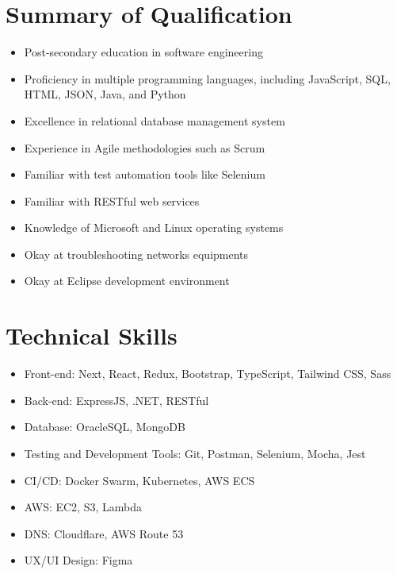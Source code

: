 \documentclass[a4paper,11pt]{article}
\begin{document}
\section{Summary of Qualification}
\begin{itemize}[nosep,after=\strut, leftmargin=1em, itemsep=3pt]
\item Post-secondary education in software engineering\item Proficiency in multiple programming languages, including JavaScript, SQL, HTML, JSON, Java, and Python\item Excellence in relational database management system\item Experience in Agile methodologies such as Scrum\item Familiar with test automation tools like Selenium\item Familiar with RESTful web services\item Knowledge of Microsoft and Linux operating systems\item Okay at troubleshooting networks equipments\item Okay at Eclipse development environment
\end{itemize}
\section{Technical Skills}
\begin{itemize}[nosep,after=\strut, leftmargin=1em, itemsep=3pt]
\item Front-end: Next, React, Redux, Bootstrap, TypeScript, Tailwind CSS, Sass\item Back-end: ExpressJS, .NET, RESTful\item Database: OracleSQL, MongoDB\item Testing and Development Tools: Git, Postman, Selenium, Mocha, Jest\item CI/CD: Docker Swarm, Kubernetes, AWS ECS\item AWS: EC2, S3, Lambda\item DNS: Cloudflare, AWS Route 53\item UX/UI Design: Figma
\end{itemize}


\end{document}
